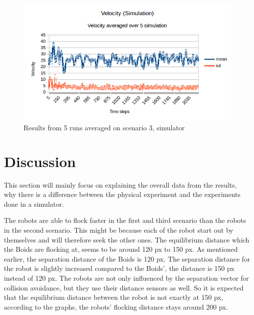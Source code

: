 \begin{figure}[h]
\begin{center}
\includegraphics[width=0.8\linewidth]{figs/runs/3svel}
\end{center}
\caption[3. Velocity, robots]{Results from 5 runs averaged on scenario 3, simulator}
\label{fig:res3svel}
\end{figure}

\clearpage
\section{Discussion}
\label{sec:discussion}
This section will mainly focus on explaining the overall data from the results, why there is a difference between the physical experiment and the experiments done in a simulator.

The robots are able to flock faster in the first and third scenario than the robots in the second scenario. This might be because each of the robot start out by themselves and will therefore seek the other ones.
The equilibrium distance which the Boids are flocking at, seems to be around 120 px to 150 px. As mentioned earlier, the separation distance of the Boids is 120 px.
The separation distance for the robot is slightly increased compared to the Boids', the distance is 150 px instead of 120 px. The robots are not only influenced by the separation vector for collision avoidance, but they use their distance sensors as well. So it is expected that the equilibrium distance between the robot is not exactly at 150 px, according to the graphs, the robots' flocking distance stays around 200 px.


